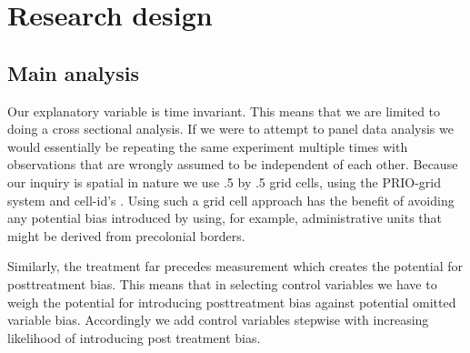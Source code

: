 

% 

\section{Research design} \label{Research design}
\subsection{Main analysis} \label{Main analysis}
 
Our explanatory variable is time invariant. This means that we are limited to
doing a cross sectional analysis. If we were to attempt to panel data analysis
we would essentially be repeating the same experiment multiple times with
observations that are wrongly assumed to be independent of each other. 
Because our inquiry is spatial in nature we use .5\degree \hspace{1pt} by
.5\degree \hspace{1pt} grid cells, using the PRIO-grid system and cell-id's
\citep{Tollefsen2012}. Using such a grid cell approach has the benefit of
avoiding any potential bias introduced by using, for example, administrative
units that might be derived from precolonial borders.

Similarly, the treatment far precedes measurement which creates the potential for
posttreatment bias. This means that in selecting control variables we have to
weigh the potential for introducing posttreatment bias against potential omitted
variable bias. Accordingly we add control variables stepwise with increasing
likelihood of introducing post treatment bias.

